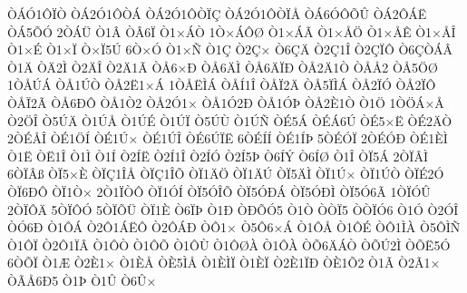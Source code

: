 {^^d2^^c1^^d31^^d4^^cf^^d2
^^d2^^c12^^d31^^d4^^d2^^c1
^^d2^^c12^^d31^^d4^^d2^^cf^^c7
^^d2^^c12^^d31^^d4^^d2^^cf^^c5
^^d2^^c16^^d3^^d4^^d5^^db
^^d2^^c12^^d4^^c1^^cb
^^d2^^c15^^d5^^d3
2^^d2^^c1^^dc
^^d21^^c2
^^d2^^c26^^cf
^^d21^^d7^^c1^^d2
1^^d2^^d7^^c1^^d4^^d8
^^d21^^d7^^c1^^c3
^^d21^^d7^^c5^^d6
^^d21^^d7^^c5^^ca
^^d21^^d7^^c5^^ce
^^d21^^d7^^c9
^^d21^^d7^^cf
^^d2^^d7^^cf5^^da
6^^d2^^d7^^d3
^^d21^^d7^^d1
^^d21^^c7
^^d22^^c7^^d7
^^d26^^c7^^c4
^^d22^^c71^^ce
^^d22^^c7^^cf^^d4
^^d26^^c7^^d2^^c1^^c2
^^d21^^c4
^^d2^^c42^^cc
^^d22^^c4^^ce
^^d22^^c41^^c3
^^d2^^c56^^d7^^d0
^^d2^^c56^^c4^^cc
^^d2^^c56^^c4^^cf^^d0
^^d2^^c52^^c41^^d2
^^d2^^c5^^c52
^^d2^^c55^^d6^^d8
1^^d2^^c5^^da^^c1
^^d2^^c51^^da^^d2
^^d2^^c52^^cb1^^d7^^c1
1^^d2^^c5^^cb^^cc^^c1
^^d2^^c5^^cd1^^ce
^^d2^^c5^^cf2^^c4
^^d2^^c55^^cf^^cc^^c1
^^d2^^c52^^cf^^d3
^^d2^^c52^^cf^^d4
^^d2^^c5^^cf2^^c3
^^d2^^c56^^d0^^d4
^^d2^^c51^^d22
^^d2^^c52^^d31^^d7
^^d2^^c51^^d32^^d0
^^d2^^c51^^d3^^de
^^d2^^c52^^c81^^d2
^^d21^^d6
1^^d2^^d6^^c1^^d7^^c5
^^d22^^d6^^ce
^^d25^^da^^c4
^^d21^^da^^c5
^^d21^^da^^c9
^^d21^^da^^cf
^^d25^^da^^d9
^^d21^^da^^d1
^^d2^^c95^^c1
^^d2^^c9^^c16^^da
^^d2^^c95^^d7^^cb
^^d2^^c92^^c4^^d2
2^^d2^^c9^^c5^^ce
^^d2^^c91^^d6^^cd
^^d2^^c91^^da^^d7
^^d2^^c91^^da^^ce
^^d2^^c96^^da^^cf^^cb
6^^d2^^c9^^cd^^cd
^^d2^^c91^^cd^^de
5^^d2^^c9^^d3^^cf
2^^d2^^c9^^d3^^d0
^^d2^^c91^^c8^^cc
^^d21^^cb
^^d2^^cb1^^ce
^^d21^^cc
^^d21^^cd
^^d22^^cd^^cb
^^d22^^cd1^^ce
^^d22^^cd^^d3
^^d22^^cd5^^de
^^d26^^cd^^dd
^^d26^^cd^^d8
^^d21^^ce
^^d2^^cf5^^c1
2^^d2^^cf^^c2^^cc
6^^d2^^cf^^c2^^df
^^d2^^cf5^^d7^^c8
^^d2^^cf^^c71^^ce^^c5
^^d2^^cf^^c71^^ce^^d5
^^d2^^cf1^^c4^^d6
^^d2^^cf1^^c4^^da
^^d2^^cf5^^c4^^cc
^^d2^^cf1^^da^^d7
^^d2^^cf1^^da^^d2
^^d2^^cf^^c92^^d3
^^d2^^cf6^^d0^^d4
^^d2^^cf1^^d2^^d7
2^^d21^^cf^^d2^^d4
^^d2^^cf1^^d3^^cd
^^d2^^cf5^^d3^^ce^^d5
^^d2^^cf5^^d3^^d0^^c1
^^d2^^cf5^^d3^^d0^^cc
^^d2^^cf5^^d36^^c3
1^^d2^^cf^^d3^^db
2^^d2^^cf^^d4^^c4
5^^d2^^cf^^d4^^d3
5^^d2^^cf^^d5^^dc
^^d2^^cf1^^c8
^^d26^^cf^^de
^^d21^^d0
^^d2^^d0^^d5^^d35
^^d21^^d2
^^d2^^d2^^cf5
^^d2^^d2^^cf^^d36
^^d21^^d3
^^d22^^d3^^ce
^^d2^^d36^^d0
^^d21^^d4^^c1
^^d22^^d41^^c1^^cb^^d4
^^d22^^d4^^c1^^d0
^^d2^^d41^^d7
^^d25^^d46^^d7^^c1
^^d21^^d4^^c5
^^d21^^d4^^c9
^^d2^^d41^^cc^^c0
^^d25^^d4^^cc^^d1
^^d21^^d4^^cf
^^d22^^d41^^cf^^c2
^^d21^^d4^^d2
^^d21^^d4^^d5
^^d21^^d4^^d9
^^d21^^d4^^d8^^c0
^^d21^^d4^^c0
^^d2^^d56^^c4^^c1^^d2
^^d2^^d5^^da2^^cc
^^d2^^d5^^cb5^^d3
6^^d2^^d5^^cf
^^d21^^c6
^^d22^^c81^^d7
^^d21^^c8^^c5
^^d2^^c85^^cc^^c5
^^d21^^c8^^cc^^cf
^^d21^^c8^^cf
^^d22^^c81^^cf^^d0
^^d2^^c81^^d52
^^d21^^c3
^^d22^^c31^^d7
^^d2^^c3^^c56^^d05
^^d21^^de
^^d21^^db
^^d26^^db^^d7
}
